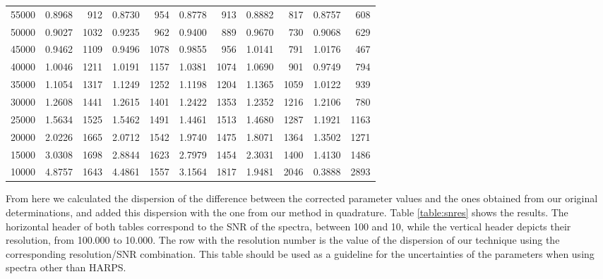 \documentclass[referee]{aa}
\begin{document}
\begin{table}[]
\begin{center}
{{\begin{tabular}{l r r r r r r r r r r}
55000 & 0.8968 & 912 & 0.8730 & 954 & 0.8778 & 913 & 0.8882 & 817 & 0.8757 & 608 \\
50000 & 0.9027 & 1032 & 0.9235 & 962 & 0.9400 & 889 & 0.9670 & 730 & 0.9068 & 629 \\
45000 & 0.9462 & 1109 & 0.9496 & 1078 & 0.9855 & 956 & 1.0141 & 791 & 1.0176 & 467 \\
40000 & 1.0046 & 1211 & 1.0191 & 1157 & 1.0381 & 1074 & 1.0690 & 901 & 0.9749 & 794 \\
35000 & 1.1054 & 1317 & 1.1249 & 1252 & 1.1198 & 1204 & 1.1365 & 1059 & 1.0122 & 939 \\
30000 & 1.2608 & 1441 & 1.2615 & 1401 & 1.2422 & 1353 & 1.2352 & 1216 & 1.2106 & 780 \\
25000 & 1.5634 & 1525 & 1.5462 & 1491 & 1.4461 & 1513 & 1.4680 & 1287 & 1.1921 & 1163 \\
20000 & 2.0226 & 1665 & 2.0712 & 1542 & 1.9740 & 1475 & 1.8071 & 1364 & 1.3502 & 1271 \\
15000 & 3.0308 & 1698 & 2.8844 & 1623 & 2.7979 & 1454 & 2.3031 & 1400 & 1.4130 & 1486 \\
10000 & 4.8757 & 1643 & 4.4861 & 1557 & 3.1564 & 1817 & 1.9481 & 2046 & 0.3888 & 2893 \\
\hline
\end{tabular}
}}
\end{center}
\end{table}

From here we calculated the dispersion of the difference between the corrected parameter values and the ones obtained from our original determinations, and added this dispersion with the one from our method in quadrature. Table \ref{table:snres} shows the results. The horizontal header of both tables correspond to the SNR of the spectra, between 100 and 10,  while the vertical header depicts their resolution, from 100.000 to 10.000. The row with the resolution number is the value of the dispersion of our technique using the corresponding resolution/SNR combination. This table should be used as a guideline for the uncertainties of the parameters when using spectra other than HARPS.
\end{document}
